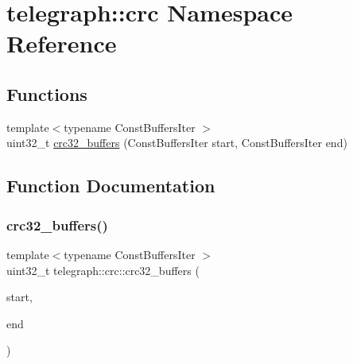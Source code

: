\hypertarget{namespacetelegraph_1_1crc}{}\section{telegraph\+:\+:crc Namespace Reference}
\label{namespacetelegraph_1_1crc}
\subsection*{Functions}
\begin{DoxyCompactItemize}
\item 
{\footnotesize template$<$typename Const\+Buffers\+Iter $>$ }\\uint32\+\_\+t \hyperlink{namespacetelegraph_1_1crc_a3152a661ad8854e339e75baa81a6c57e}{crc32\+\_\+buffers} (Const\+Buffers\+Iter start, Const\+Buffers\+Iter end)
\end{DoxyCompactItemize}


\subsection{Function Documentation}
\mbox{\label{namespacetelegraph_1_1crc_a3152a661ad8854e339e75baa81a6c57e}} 
\subsubsection{\texorpdfstring{crc32\+\_\+buffers()}{crc32\_buffers()}}
{\footnotesize\ttfamily template$<$typename Const\+Buffers\+Iter $>$ \\
uint32\+\_\+t telegraph\+::crc\+::crc32\+\_\+buffers (\begin{DoxyParamCaption}\item[{Const\+Buffers\+Iter}]{start,  }\item[{Const\+Buffers\+Iter}]{end }\end{DoxyParamCaption})}

